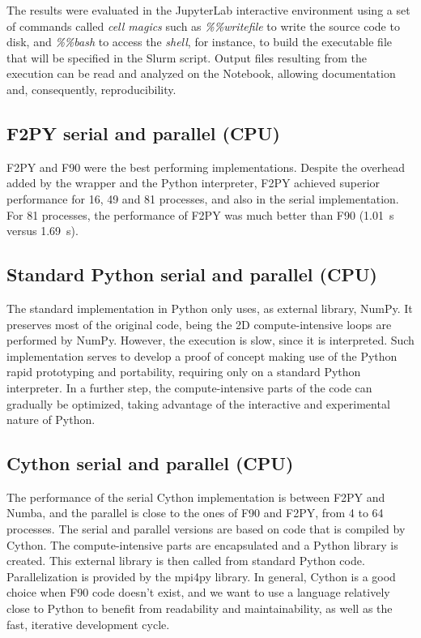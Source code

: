 The results were evaluated in the JupyterLab interactive environment using a set of commands called \textit {cell magics} such as  \textit {\%\%writefile} to write the source code to disk, and \textit {\%\%bash} to access the \textit {shell}, for instance, to build the executable file that will be specified in the Slurm script. Output files resulting from the execution can be read and analyzed on the Notebook, allowing documentation and, consequently, reproducibility. 

%
%
%
\subsection{F2PY serial and parallel (CPU)}
\label{sec_stenf2py}

F2PY and F90 were the best performing implementations. Despite the overhead added by the wrapper and the Python interpreter, F2PY achieved superior performance for 16, 49 and 81 processes, and also in the serial implementation. For 81 processes, the performance of F2PY was much better than F90 (1.01~s versus 1.69~s).

%
%
%
\subsection{Standard Python serial and parallel (CPU)}
\label{sec_stenpyth}

The standard implementation in Python only uses, as external library, NumPy. It preserves most of the original code, being the 2D compute-intensive loops are performed by NumPy. However, the execution is slow, since it is interpreted. Such implementation serves to develop a proof of concept making use of the Python rapid prototyping and portability, requiring only on a standard Python interpreter. In a further step, the compute-intensive parts of the code can gradually be optimized, taking advantage of the interactive and experimental nature of Python.

%
%
%
\subsection{Cython serial and parallel (CPU)}
\label{sec_stencyth}

The performance of the serial Cython implementation is between F2PY and Numba, and the parallel is close to the ones of F90 and F2PY, from 4 to 64 processes. The serial and parallel versions are based on code that is compiled by Cython. The compute-intensive parts are encapsulated and a Python library is created. This external library is then called from standard Python code. Parallelization is provided by the mpi4py library. In general, Cython is a good choice when F90 code doesn't exist, and we want to use a language relatively close to Python to benefit from readability and maintainability, as well as the fast, iterative development cycle.

